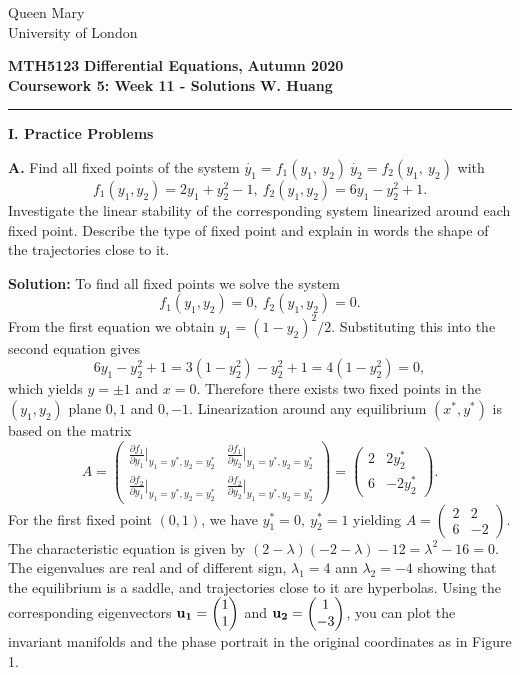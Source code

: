 \documentclass[11pt,a4paper,twoside]{article}
\begin{document}
	\begin{singlespace}
		\begin{center}
			\Huge Queen Mary\\
			\LARGE University of London
		\end{center}
		\Large \textbf{MTH5123} \hfill \Large \textbf{Differential Equations,} \hfill \Large \textbf{Autumn 2020}\\
		\large \textbf{Coursework 5: Week 11 - Solutions} \hfill \large \textbf{W. Huang}
		\rule{\textwidth}{0.4pt}
	\end{singlespace}
	\textbf{I. Practice Problems}\par
	\textbf{A.} Find all fixed points of the system $\dot{y_1} = f_1(y_1,\ y_2)\ \dot{y_2} = f_2(y_1,\ y_2)$ with
	$$
	f_1(y_1, y_2) = 2y_1 + y_2^2 - 1,\ f_2(y_1, y_2) = 6y_1 - y_2^2 + 1.
	$$
	Investigate the linear stability of the corresponding system linearized around each fixed point. Describe the type of fixed point and explain in words the shape of the trajectories close to it.\par
	\textbf{Solution:} To find all fixed points we solve the system
	$$
	f_1(y_1, y_2) = 0,\ f_2(y_1, y_2) = 0.
	$$
	From the first equation we obtain $y_1 = (1 - y_2)^2/2$. Substituting this into the second equation gives
	$$
	6y_1 - y_2^2 + 1 = 3(1 - y_2^2) - y_2^2 + 1 = 4(1 - y_2^2) = 0,
	$$
	which yields $y = \pm 1$ and $x = 0$. Therefore there exists two fixed points in the $(y_1, y_2)$ plane $0, 1$ and $0, -1$. Linearization around any equilibrium $(x^*, y^*)$ is based on the matrix
	$$
	A =
	\begin{pmatrix}
		\frac{\partial f_1}{\partial y_1}|_{y_1 = y^*, y_2 = y_2^*} & \frac{\partial f_1}{\partial y_2}|_{y_1 = y^*, y_2 = y_2^*}\\
		\frac{\partial f_2}{\partial y_1}|_{y_1 = y^*, y_2 = y_2^*} & \frac{\partial f_2}{\partial y_2}|_{y_1 = y^*, y_2 = y_2^*}
	\end{pmatrix}
	=
	\begin{pmatrix}
		2 & 2y_2^*\\
		6 & -2y_2^*
	\end{pmatrix}.
	$$
	For the first fixed point $(0, 1)$, we have $y_1^* = 0,\ y_2^* = 1$ yielding 
	$
	A =
	\begin{pmatrix}
		2 & 2\\
		6 & -2
	\end{pmatrix}
	$.
	The characteristic equation is given by $(2-\lambda)(-2-\lambda) - 12 = \lambda^2 - 16 = 0$. The eigenvalues are real and of different sign, $\lambda_1 = 4$ ann $\lambda_2 = -4$ showing that the equilibrium is a saddle, and trajectories close to it are hyperbolas. Using the corresponding eigenvectors $\vb{u_1} = \begin{pmatrix}1 \\ 1\end{pmatrix}$ and $\vb{u_2} = \begin{pmatrix}1 \\ -3\end{pmatrix}$,  you can plot the invariant manifolds and the phase portrait in the original coordinates as in Figure 1.
\end{document}
